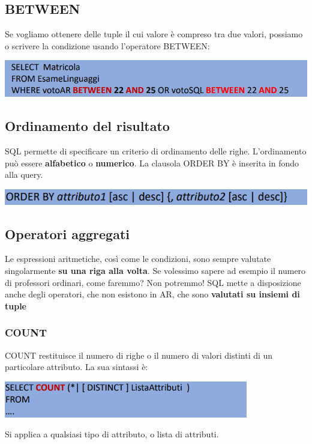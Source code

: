 \documentclass[12pt]{article}
\begin{document}
\subsection{BETWEEN}
Se vogliamo ottenere delle tuple il cui valore è compreso tra due valori, possiamo o scrivere la condizione
usando l'operatore BETWEEN:
\begin{center}
    \includegraphics[width = 1\textwidth]{Images/212.PNG}
\end{center}
\subsection{Ordinamento del risultato}
SQL permette di specificare un criterio di ordinamento delle righe.
L'ordinamento può essere \textbf{alfabetico} o \textbf{numerico}.
La clausola ORDER BY è inserita in fondo alla query.
\begin{center}
    \includegraphics[width = 1\textwidth]{Images/213.PNG}
\end{center}
\subsection{Operatori aggregati}
Le espressioni aritmetiche, così come le condizioni, sono sempre valutate singolarmente \textbf{su una riga alla volta}.
Se volessimo sapere ad esempio il numero di professori ordinari, come faremmo? Non potremmo!
SQL mette a disposizione anche degli operatori, che non esistono in AR, che sono \textbf{valutati su insiemi di tuple}
\subsubsection{COUNT}
COUNT restituisce il numero di righe o il numero di valori distinti di un particolare attributo.
La sua sintassi è:
\begin{center}
    \includegraphics[width = 0.80\textwidth]{Images/214.PNG}
\end{center}
Si applica a qualsiasi tipo di attributo, o lista di attributi.
\end{document}
